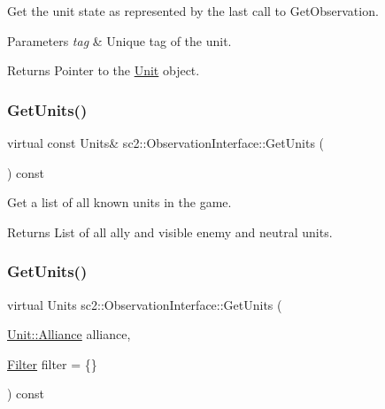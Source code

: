 Get the unit state as represented by the last call to Get\+Observation. 
\begin{DoxyParams}{Parameters}
{\em tag} & Unique tag of the unit. \\
\hline
\end{DoxyParams}
\begin{DoxyReturn}{Returns}
Pointer to the \hyperlink{classsc2_1_1_unit}{Unit} object. 
\end{DoxyReturn}
\mbox{\label{classsc2_1_1_observation_interface_ab08e71ba04b19d3b4048ce9da6838e00}} 
\subsubsection{\texorpdfstring{Get\+Units()}{GetUnits()}\hspace{0.1cm}{\footnotesize\ttfamily [1/3]}}
{\footnotesize\ttfamily virtual const Units\& sc2\+::\+Observation\+Interface\+::\+Get\+Units (\begin{DoxyParamCaption}{ }\end{DoxyParamCaption}) const\hspace{0.3cm}{\ttfamily [pure virtual]}}

Get a list of all known units in the game. \begin{DoxyReturn}{Returns}
List of all ally and visible enemy and neutral units. 
\end{DoxyReturn}
\mbox{\label{classsc2_1_1_observation_interface_aa43cfa17a9ac893500bce33eb41e6171}} 
\subsubsection{\texorpdfstring{Get\+Units()}{GetUnits()}\hspace{0.1cm}{\footnotesize\ttfamily [2/3]}}
{\footnotesize\ttfamily virtual Units sc2\+::\+Observation\+Interface\+::\+Get\+Units (\begin{DoxyParamCaption}\item[{\hyperlink{classsc2_1_1_unit_a5a40e672e7599d73ef8ef5758bbd7461}{Unit\+::\+Alliance}}]{alliance,  }\item[{\hyperlink{sc2__interfaces_8h_af4abbeea3291e718cf2283e1390f3670}{Filter}}]{filter = {\ttfamily \{\}} }\end{DoxyParamCaption}) const\hspace{0.3cm}{\ttfamily [pure virtual]}}

